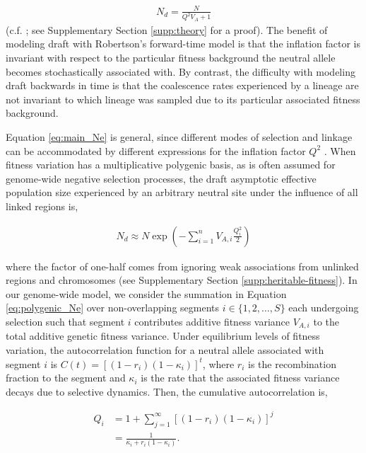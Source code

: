 \documentclass[11pt]{article}
\begin{document}
\begin{align}
    \label{eq:main_Ne}
    N_d = \frac{N}{Q^2 V_A + 1}
\end{align}
%
(c.f. \cite{Robertson1961-ho,Santiago1995-hx}; see Supplementary Section
\ref{supp:theory} for a proof). The benefit of modeling draft with Robertson's
forward-time model is that the inflation factor is invariant with respect to
the particular fitness background the neutral allele becomes stochastically
associated with. By contrast, the difficulty with modeling draft backwards in
time is that the coalescence rates experienced by a lineage are not invariant
to which lineage was sampled due to its particular associated fitness
background.

Equation \eqref{eq:main_Ne} is general, since different modes of selection and
linkage can be accommodated by different expressions for the inflation factor
$Q^2$ \parencite{Santiago1995-hx,Santiago1998-bs}. When fitness variation has a
multiplicative polygenic basis, as is often assumed for genome-wide negative
selection processes, the draft asymptotic effective population size experienced
by an arbitrary neutral site under the influence of all linked regions is,

\begin{align}
    \label{eq:polygenic_Ne}
    N_d \approx N \exp\left(-\sum_{i=1}^n V_{A,i} \frac{Q_i^2}{2}\right)
\end{align}

where the factor of one-half comes from ignoring weak associations from
unlinked regions and chromosomes (see Supplementary Section
\ref{supp:heritable-fitness}). In our genome-wide model, we consider the
summation in Equation \eqref{eq:polygenic_Ne} over non-overlapping segments $i
\in \{1, 2, \ldots, S\}$ each undergoing selection such that segment $i$
contributes additive fitness variance $V_{A,i}$ to the total additive genetic
fitness variance. Under equilibrium levels of fitness variation, the
autocorrelation function for a neutral allele associated with segment $i$ is
$C(t) = [(1-r_i)(1-\kappa_i)]^t$, where $r_i$ is the recombination fraction to
the segment and $\kappa_i$ is the rate that the associated fitness variance
decays due to selective dynamics. Then, the cumulative autocorrelation is,

\begin{align}
    \label{eq:Q}
    Q_i &= 1 + \sum_{j=1}^\infty \left[(1-r_i)(1-\kappa_i)\right]^j \nonumber \\
        &= \frac{1}{\kappa_i + r_i(1-\kappa_i)}.
\end{align}
\end{document}
